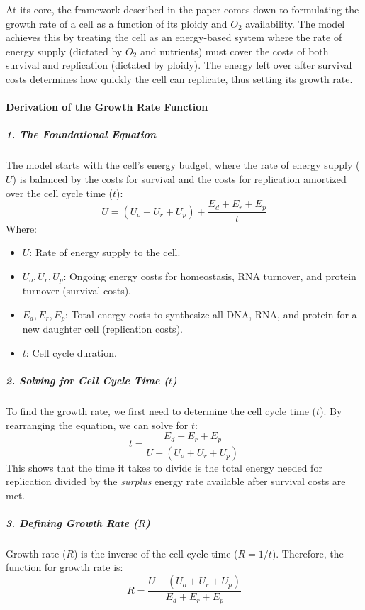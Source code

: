 \documentclass{article}
\begin{document}
At its core, the framework described in the paper comes down to formulating the growth rate of a cell as a function of its ploidy and $O_2$ availability. The model achieves this by treating the cell as an energy-based system where the rate of energy supply (dictated by $O_2$ and nutrients) must cover the costs of both survival and replication (dictated by ploidy). The energy left over after survival costs determines how quickly the cell can replicate, thus setting its growth rate.

\paragraph{Derivation of the Growth Rate Function}

\subparagraph{1. The Foundational Equation}
The model starts with the cell's energy budget, where the rate of energy supply ($U$) is balanced by the costs for survival and the costs for replication amortized over the cell cycle time ($t$):
$$
U = (U_o + U_r + U_p) + \frac{E_d + E_r + E_p}{t}
$$
Where:
\begin{itemize}
    \item $U$: Rate of energy supply to the cell.
    \item $U_o, U_r, U_p$: Ongoing energy costs for homeostasis, RNA turnover, and protein turnover (survival costs).
    \item $E_d, E_r, E_p$: Total energy costs to synthesize all DNA, RNA, and protein for a new daughter cell (replication costs).
    \item $t$: Cell cycle duration.
\end{itemize}

\subparagraph{2. Solving for Cell Cycle Time ($t$)}
To find the growth rate, we first need to determine the cell cycle time ($t$). By rearranging the equation, we can solve for $t$:
$$
t = \frac{E_d + E_r + E_p}{U - (U_o + U_r + U_p)}
$$
This shows that the time it takes to divide is the total energy needed for replication divided by the \textit{surplus} energy rate available after survival costs are met.

\subparagraph{3. Defining Growth Rate ($R$)}
Growth rate ($R$) is the inverse of the cell cycle time ($R = 1/t$). Therefore, the function for growth rate is:
$$
R = \frac{U - (U_o + U_r + U_p)}{E_d + E_r + E_p}
$$
\end{document}

